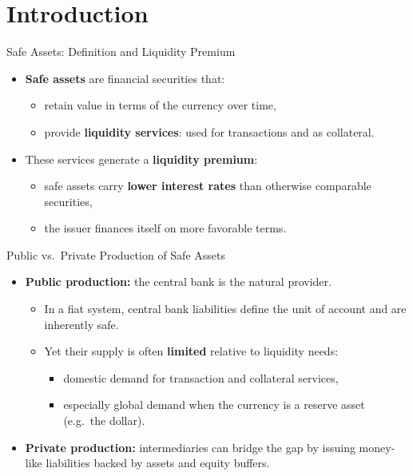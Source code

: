 \documentclass[11pt,aspectratio=169]{beamer}
\begin{document}
\section{Introduction}
\begin{frame}{Safe Assets: Definition and Liquidity Premium}
\small
\begin{itemize}
  \item \textbf{Safe assets} are financial securities that:
  \begin{itemize}
    \item retain value in terms of the currency over time,
    \item provide \textbf{liquidity services}: used for transactions and as collateral.
  \end{itemize}
  \vspace{0.45em}
  \item These services generate a \textbf{liquidity premium}:
  \begin{itemize}
    \item safe assets carry \textbf{lower interest rates} than otherwise comparable securities,
    \item the issuer finances itself on more favorable terms.
  \end{itemize}
\end{itemize}
\end{frame}

\begin{frame}{Public vs.\ Private Production of Safe Assets}
\small
\begin{itemize}
  \item \textbf{Public production:} the central bank is the natural provider.
  \begin{itemize}
    \item In a fiat system, central bank liabilities define the unit of account and are inherently safe.
    \item Yet their supply is often \textbf{limited} relative to liquidity needs:
    \begin{itemize}
      \item domestic demand for transaction and collateral services,
      \item especially global demand when the currency is a reserve asset (e.g.\ the dollar).
    \end{itemize}
  \end{itemize}
  \vspace{0.35em}
  \item \textbf{Private production:} intermediaries can bridge the gap by issuing money-like liabilities backed by assets and equity buffers.
\end{itemize}
\end{frame}
\end{document}
